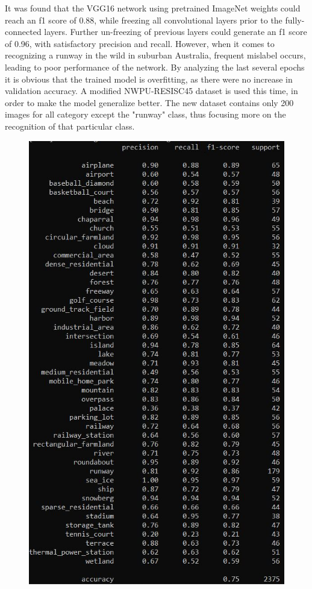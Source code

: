 \documentclass[10pt,twocolumn,letterpaper]{article}
\begin{document}
It was found that the VGG16 network using pretrained ImageNet weights could reach an f1 score of 0.88, while freezing all convolutional layers prior to the fully-connected layers. Further un-freezing of previous layers could generate an f1 score of 0.96, with satisfactory precision and recall. However, when it comes to recognizing a runway in the wild in suburban Australia, frequent mislabel occurs, leading to poor performance of the network. By analyzing the last several epochs it is obvious that the trained model is overfitting, as there were no increase in validation accuracy. A modified NWPU-RESISC45 dataset is used this time, in order to make the model generalize better. The new dataset contains only 200 images for all category except the "runway" class, thus focusing more on the recognition of that particular class.
\begin{figure}[t]
\begin{center}
   \includegraphics[width=1.0\linewidth]{modified_vgg16.jpg}

\end{center}
\end{figure}
\end{document}
